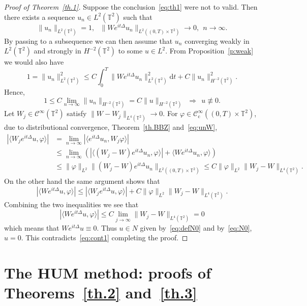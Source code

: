 \documentclass[AHL, Unicode, longabstracts]{cedram}
\newcommand{\CI}{{\mathcal C}^\infty }
\newcommand{\CIc}{{\mathcal C}^\infty_{\mathrm{c}} }
\newcommand{\TT}{{\mathbb T}}
\newcommand{\TT}{{\mathbb T}}
\newcommand*{\dd}{\mathrm{d}}
\newcommand*{\dt}{\dd t}
\begin{document}
\begin{proof}[Proof of Theorem~\ref{th.1}]
Suppose the conclusion~\eqref{eq:th1} were not to valid. Then there exists a sequence $ u_n \in L^2 (\TT^2) $ such that
\begin{equation}\label{eq:unW}
\| u_n \|_{ L^2 (\TT^2) } = 1, \ \ \
\| W e^{it \Delta } u_n \|_{ L^2 ((0, T) \times \TT^2) }\to 0, \ \ n
\to \infty.
\end{equation}
By passing to a subsequence we can then assume that $ u_n $ converging weakly in $ L^2 (\TT^2) $ and strongly in $ H^{-2} (\TT^2) $ to some $ u \in L^2 $. From Proposition~\ref{p:weak} we would also have
\[
1 = \| u_n \|_{ L^2 (\TT^2) }^2 \leq C
\int_0^T \| W e^{it \Delta } u_n \|_{ L^2 (\TT^2) }^2 \dt + C \| u_n \|^2_ {H^{-2} (\TT^2) }.
\]
Hence,
\begin{equation}\label{eq:cont1}
1 \leq C \lim_{n \to \infty } \| u_n \|_{H^{-2} (\TT^2) } = C\| u \|_{ H^{-2} (\TT^2) }
\ \ \Longrightarrow \ \ u \not \equiv 0.
\end{equation}
Let $ W_j \in \CI (\TT^2) $ satisfy $ \| W - W_j \|_{L^4 (\TT^2) }
\to 0 $. For $ \varphi \in \CIc ((0, T) \times \TT^2) $, due to distributional convergence, Theorem~\ref{th.BBZ} and~\eqref{eq:unW},
\[
\begin{split} |\langle W_j e^{ it\Delta } u, \varphi \rangle| & = \lim_{ n \to \infty }
|\langle e^{ it \Delta } u_n, W_j \varphi \rangle| \\
&\leq
\lim_{ n \to \infty }
\left(| \langle (W_j - W) e^{ i t \Delta } u_n, \varphi \rangle | +
\langle W e^{ it \Delta } u_n, \varphi \rangle \right) \\ & \leq
\|\varphi \|_{ L^2 } \| (W_j - W) e^{it \Delta } u_n \|_{L^2 ((0, T) \times
\TT^2) }
\leq C\|\varphi \|_{L^2 } \| W_j - W \|_{L^4(\TT^2) }.
\end{split}
\]
On the other hand the same argument shows that
\[
| \langle W e^{it \Delta }u, \varphi \rangle | \leq | \langle W_j e^{ it \Delta } u, \varphi \rangle | + C \| \varphi\|_{L^2} \| W_j - W \|_{L^4(\TT^2) }.
\]
Combining the two inequalities we see that 
\[
|\langle W e^{it \Delta }u, \varphi \rangle | \leq C
\lim_{ j \to \infty } \| W_j - W \|_{L^4(\TT^2) } = 0
\]
which means that $ W e^{ it \Delta } u \equiv 0 $. Thus $ u \in N $ given by~\eqref{eq:defN0} and by~\eqref{eq:N0}, $ u = 0 $. This contradicts~\eqref{eq:cont1} completing the proof.
\end{proof}


\section{The HUM method: proofs of Theorems~\ref{th.2} and~\ref{th.3}}\label{HUM}
\end{document}
